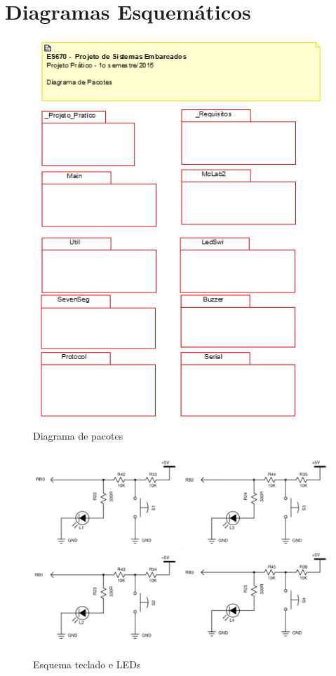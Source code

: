 \documentclass{article}
\begin{document}
\section{Diagramas Esquemáticos}

\begin{figure}[H]
	\centering
	\includegraphics[width=0.7\linewidth]{pacotes}
	\caption{Diagrama de pacotes}
	\label{fig:pacotes}
\end{figure}
\begin{figure}[H]
	\centering
	\includegraphics[width=0.7\linewidth]{esq_ledswi}
	\caption{Esquema teclado e LEDs}
	\label{fig:esq_ledswi}
\end{figure}
\end{document}
